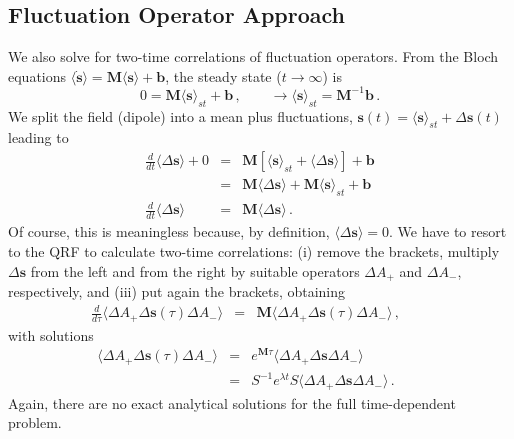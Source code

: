 \documentclass[twocolumn,aps,eqsecnum,showkeys,amsmath]{revtex4-2}
\begin{document}
\subsection{Fluctuation Operator Approach}
We also solve for two-time correlations of fluctuation operators. From the 
Bloch equations $\langle \mathbf{\dot{s}} \rangle = 
\mathbf{M} \langle \mathbf{s} \rangle +\mathbf{b}$, the steady state 
($t \to \infty$) is 
%
\begin{equation}
0 =\mathbf{M} \langle \mathbf{s} \rangle_{st} +\mathbf{b}  \,, 
    \qquad \to \langle \mathbf{s} \rangle_{st} 
       =\mathbf{M}^{-1} \mathbf{b} \,.  \label{eq:SBlochss}	
\end{equation}
We split the field (dipole) into a mean plus fluctuations, 
$\mathbf{s}(t) = \langle \mathbf{s} \rangle_{st} +\Delta \mathbf{s}(t)$ 
leading to 
%
\begin{eqnarray}
\frac{d}{dt} \langle \Delta \mathbf{s} \rangle +0
&=& \mathbf{M} \left[ \langle \mathbf{s} \rangle_{st} 
	+\langle \Delta \mathbf{s} \rangle \right] +\mathbf{b}  \nonumber \\
&=& \mathbf{M} \langle \Delta \mathbf{s} \rangle 
	+\mathbf{M} \langle \mathbf{s} \rangle_{st} +\mathbf{b}  
	\nonumber 	\\
\frac{d}{dt} \langle \Delta \mathbf{s} \rangle 
	&=& \mathbf{M} \langle \Delta \mathbf{s} \rangle  \,.
\end{eqnarray}
Of course, this is meaningless because, by definition, 
$\langle \Delta \mathbf{s} \rangle =0$. We have to resort to the QRF 
to calculate two-time correlations: (i) remove the brackets, multiply 
$\Delta \mathbf{s}$ from the left and from the right by suitable operators 
$\Delta A_+$ and $\Delta A_-$, respectively, and (iii) put again the 
brackets, obtaining 
%
\begin{eqnarray}
\frac{d}{d\tau} \langle \Delta A_+ \Delta \mathbf{s}(\tau) \Delta A_- \rangle 
 &=& \mathbf{M} \langle \Delta A_+ \Delta \mathbf{s}(\tau) \Delta A_- \rangle  \,, 
 	\qquad	
\end{eqnarray}
with solutions 
%
\begin{eqnarray} 	\label{eq:FlucCorrSol}
\langle \Delta A_+ \Delta \mathbf{s}(\tau) \Delta A_- \rangle 
 &=& e^{\mathbf{M} \tau} \langle \Delta A_+ \Delta \mathbf{s} 
 	\Delta A_- \rangle  	\\ 
&=& S^{-1} e^{\lambda t} S  \langle \Delta A_+ \Delta \mathbf{s} 
 	\Delta A_- \rangle 	\,.	\nonumber \qquad
\end{eqnarray}
Again, there are no exact analytical solutions for the full time-dependent 
problem. 
\end{document}
